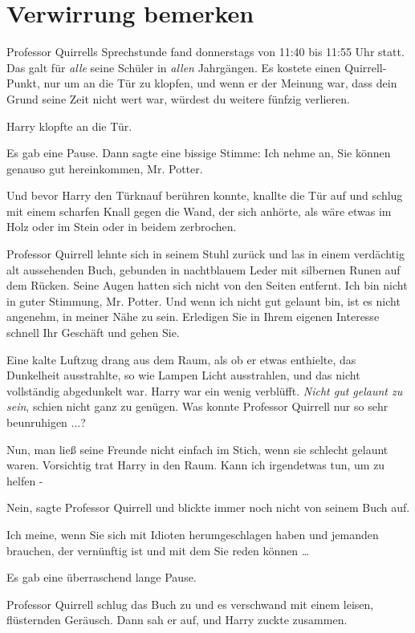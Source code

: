 \chapter{Verwirrung bemerken}

Professor Quirrells Sprechstunde fand donnerstags von 11:40 bis 11:55 Uhr statt.
Das galt für \emph{alle} seine Schüler in \emph{allen} Jahrgängen. Es kostete
einen Quirrell-Punkt, nur um an die Tür zu klopfen, und wenn er der Meinung war,
dass dein Grund seine Zeit nicht wert war, würdest du weitere fünfzig verlieren.

Harry klopfte an die Tür.

Es gab eine Pause. Dann sagte eine bissige Stimme: \glqq{}Ich nehme an, Sie
können genauso gut hereinkommen, Mr. Potter.\grqq{}

Und bevor Harry den Türknauf berühren konnte, knallte die Tür auf und schlug mit
einem scharfen Knall gegen die Wand, der sich anhörte, als wäre etwas im Holz
oder im Stein oder in beidem zerbrochen.

Professor Quirrell lehnte sich in seinem Stuhl zurück und las in einem
verdächtig alt aussehenden Buch, gebunden in nachtblauem Leder mit silbernen
Runen auf dem Rücken. Seine Augen hatten sich nicht von den Seiten entfernt.
\glqq{}Ich bin nicht in guter Stimmung, Mr. Potter. Und wenn ich nicht gut
gelaunt bin, ist es nicht angenehm, in meiner Nähe zu sein. Erledigen Sie in
Ihrem eigenen Interesse schnell Ihr Geschäft und gehen Sie.\grqq{}

Eine kalte Luftzug drang aus dem Raum, als ob er etwas enthielte, das Dunkelheit
ausstrahlte, so wie Lampen Licht ausstrahlen, und das nicht vollständig
abgedunkelt war. Harry war ein wenig verblüfft. \emph{Nicht gut gelaunt zu
sein}, schien nicht ganz zu genügen. Was konnte Professor Quirrell nur so sehr
beunruhigen ...?

Nun, man ließ seine Freunde nicht einfach im Stich, wenn sie schlecht gelaunt
waren. Vorsichtig trat Harry in den Raum. \glqq{}Kann ich irgendetwas tun, um zu
helfen -\grqq{}

\glqq{}Nein\grqq{}, sagte Professor Quirrell und blickte immer noch nicht von
seinem Buch auf.

\glqq{}Ich meine, wenn Sie sich mit Idioten herumgeschlagen haben und jemanden
brauchen, der vernünftig ist und mit dem Sie reden können …\grqq{}

Es gab eine überraschend lange Pause.

Professor Quirrell schlug das Buch zu und es verschwand mit einem leisen,
flüsternden Geräusch. Dann sah er auf, und Harry zuckte zusammen.

